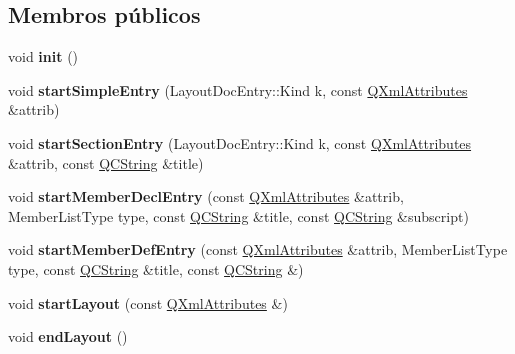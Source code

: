 \subsection*{Membros públicos}
\begin{DoxyCompactItemize}
\item 
\hypertarget{class_layout_parser_a02fd73d861ef2e4aabb38c0c9ff82947}{void {\bfseries init} ()}\label{class_layout_parser_a02fd73d861ef2e4aabb38c0c9ff82947}

\item 
\hypertarget{class_layout_parser_ad98c656b9ff25329e4ef4991768cbf5f}{void {\bfseries start\-Simple\-Entry} (Layout\-Doc\-Entry\-::\-Kind k, const \hyperlink{class_q_xml_attributes}{Q\-Xml\-Attributes} \&attrib)}\label{class_layout_parser_ad98c656b9ff25329e4ef4991768cbf5f}

\item 
\hypertarget{class_layout_parser_a5ed3e6c61daa6582ad7b9d54cc1809df}{void {\bfseries start\-Section\-Entry} (Layout\-Doc\-Entry\-::\-Kind k, const \hyperlink{class_q_xml_attributes}{Q\-Xml\-Attributes} \&attrib, const \hyperlink{class_q_c_string}{Q\-C\-String} \&title)}\label{class_layout_parser_a5ed3e6c61daa6582ad7b9d54cc1809df}

\item 
\hypertarget{class_layout_parser_ad7f339a9ac7ba7fdecb3d20b48d65dfa}{void {\bfseries start\-Member\-Decl\-Entry} (const \hyperlink{class_q_xml_attributes}{Q\-Xml\-Attributes} \&attrib, Member\-List\-Type type, const \hyperlink{class_q_c_string}{Q\-C\-String} \&title, const \hyperlink{class_q_c_string}{Q\-C\-String} \&subscript)}\label{class_layout_parser_ad7f339a9ac7ba7fdecb3d20b48d65dfa}

\item 
\hypertarget{class_layout_parser_a7b5ed25ef87b61a43713e86d2257a6fd}{void {\bfseries start\-Member\-Def\-Entry} (const \hyperlink{class_q_xml_attributes}{Q\-Xml\-Attributes} \&attrib, Member\-List\-Type type, const \hyperlink{class_q_c_string}{Q\-C\-String} \&title, const \hyperlink{class_q_c_string}{Q\-C\-String} \&)}\label{class_layout_parser_a7b5ed25ef87b61a43713e86d2257a6fd}

\item 
\hypertarget{class_layout_parser_a1fb579d0cd3324fa30f97c9c22e4fc1e}{void {\bfseries start\-Layout} (const \hyperlink{class_q_xml_attributes}{Q\-Xml\-Attributes} \&)}\label{class_layout_parser_a1fb579d0cd3324fa30f97c9c22e4fc1e}

\item 
\hypertarget{class_layout_parser_a386a02b33ca464e243fe6bd45293e973}{void {\bfseries end\-Layout} ()}\label{class_layout_parser_a386a02b33ca464e243fe6bd45293e973}


\end{DoxyCompactItemize}
